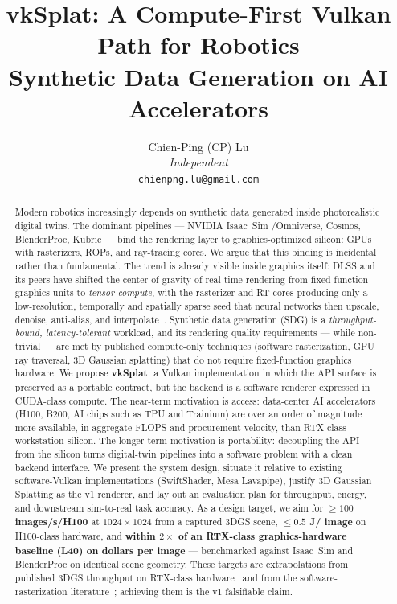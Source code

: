 \documentclass[10pt,journal]{IEEEtran}
\title{vkSplat: A Compute-First Vulkan Path for Robotics\\Synthetic Data Generation on AI Accelerators}
\author{%
    Chien-Ping (CP) Lu\\%
    \textit{Independent}\\%
    \texttt{chienpng.lu@gmail.com}%
}
\begin{document}
\maketitle

\begin{abstract}
Modern robotics increasingly depends on synthetic data generated inside
photorealistic digital twins. The dominant pipelines --- NVIDIA Isaac~Sim
\slash Omniverse, Cosmos, BlenderProc, Kubric --- bind the rendering layer to
graphics-optimized silicon: GPUs with rasterizers, ROPs, and ray-tracing
cores. We argue that this binding is incidental rather than fundamental.
The trend is already visible inside graphics itself: DLSS and its peers have
shifted the center of gravity of real-time rendering from fixed-function
graphics units to \emph{tensor compute}, with the rasterizer and RT cores
producing only a low-resolution, temporally and spatially sparse seed that
neural networks then upscale, denoise, anti-alias, and
interpolate~\cite{nvidia-dlss,liu2020nsrr,nvidia-dlss3,schied2017svgf,bitterli2020restir}.
Synthetic data generation (SDG) is a \emph{throughput-bound,
latency-tolerant} workload, and its rendering quality requirements --- while
non-trivial --- are met by published compute-only techniques (software
rasterization, GPU ray traversal, 3D Gaussian splatting) that do not require
fixed-function graphics hardware. We propose \textbf{vkSplat}: a Vulkan
implementation in which the API surface is preserved as a portable contract,
but the backend is a software renderer expressed in CUDA-class compute. The
near-term motivation is access: data-center AI accelerators (H100, B200, AI
chips such as TPU and Trainium) are over an order of magnitude more available,
in aggregate FLOPS and procurement velocity, than RTX-class workstation
silicon. The longer-term motivation is portability: decoupling the API from
the silicon turns digital-twin pipelines into a software problem with a clean
backend interface. We present the system design, situate it relative to
existing software-Vulkan implementations (SwiftShader, Mesa Lavapipe), justify
3D Gaussian Splatting as the v1 renderer, and lay out an evaluation plan for
throughput, energy, and downstream sim-to-real task accuracy. As a
design target, we aim for \textbf{$\geq 100$ images\slash s\slash H100} at
$1024{\times}1024$ from a captured 3DGS scene, \textbf{$\leq 0.5$ J\slash
image} on H100-class hardware, and \textbf{within $2{\times}$ of an
RTX-class graphics-hardware baseline (L40) on dollars per image} ---
benchmarked against Isaac~Sim and BlenderProc on identical scene
geometry. These targets are extrapolations from published 3DGS
throughput on RTX-class hardware~\cite{kerbl20233dgs} and from the
software-rasterization literature~\cite{laine2011software}; achieving
them is the v1 falsifiable claim.
\end{abstract}
\end{document}
